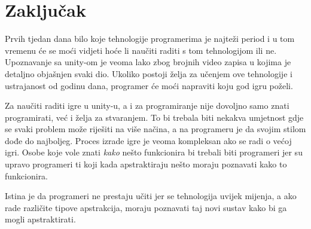 \section{Zaključak}
Prvih tjedan dana bilo koje tehnologije programerima je najteži period i u tom vremenu će se moći vidjeti hoće li naučiti raditi s tom tehnologijom ili ne. Upoznavanje sa unity-om je veoma lako zbog brojnih video zapisa u kojima je detaljno objašnjen svaki dio. Ukoliko postoji želja za učenjem ove tehnologije i ustrajanost od godinu dana, programer će moći napraviti koju god igru poželi. \par
Za naučiti raditi igre u unity-u, a i za programiranje nije dovoljno samo znati programirati, već i želja za stvaranjem. To bi trebala biti nekakva umjetnost gdje se svaki problem može riješiti na više načina, a na programeru je da svojim stilom dođe do najboljeg. Proces izrade igre je veoma kompleksan ako se radi o većoj igri. Osobe koje vole znati \emph{kako} nešto funkcionira bi trebali biti programeri jer su upravo programeri ti koji kada apstraktiraju nešto moraju poznavati kako to funkcionira. \par 
Istina je da programeri ne prestaju učiti jer se tehnologija uvijek mijenja, a ako rade različite tipove apstrakcija, moraju poznavati taj novi sustav kako bi ga mogli apstraktirati.